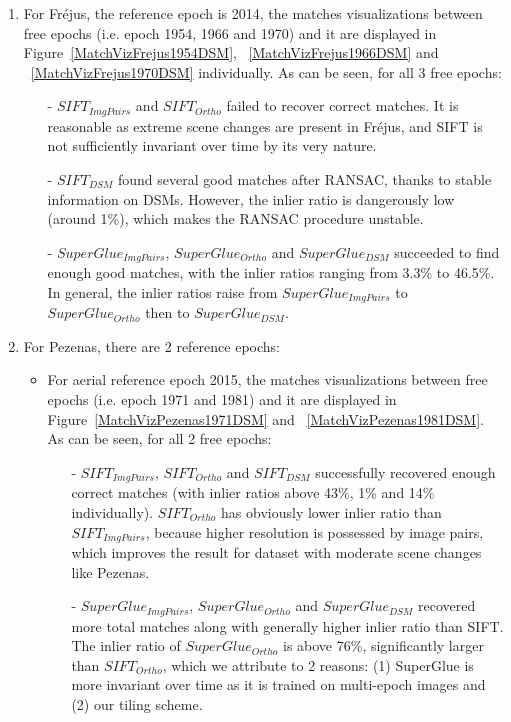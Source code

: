 \begin{enumerate}
	\item For Fr{\'e}jus, the reference epoch is 2014, the matches visualizations between free epochs (i.e. epoch 1954, 1966 and 1970) and it are displayed in Figure~\ref{MatchVizFrejus1954DSM}, ~\ref{MatchVizFrejus1966DSM} and ~\ref{MatchVizFrejus1970DSM} individually. As can be seen, for all 3 free epochs:\\
	\begin{itemize}
		\item[-] $SIFT_{ImgPairs}$ and $SIFT_{Ortho}$ failed to recover correct matches. It is reasonable as extreme scene changes are present in Fr{\'e}jus, and SIFT is not sufficiently invariant over time by its very nature.
		\item[-] $SIFT_{DSM}$ found several good matches after RANSAC, thanks to stable information on DSMs. However, the inlier ratio is dangerously low (around 1\%), which makes the RANSAC procedure unstable.
		\item[-] $SuperGlue_{ImgPairs}$, $SuperGlue_{Ortho}$ and $SuperGlue_{DSM}$ succeeded to find enough good matches, with the inlier ratios ranging from 3.3\% to 46.5\%. In general, the inlier ratios raise from $SuperGlue_{ImgPairs}$ to $SuperGlue_{Ortho}$ then to $SuperGlue_{DSM}$.
	\end{itemize}
	\item For Pezenas, there are 2 reference epochs:\\
	\begin{itemize}
	\item For aerial reference epoch 2015, the matches visualizations between free epochs (i.e. epoch 1971 and 1981) and it are displayed in Figure~\ref{MatchVizPezenas1971DSM} and ~\ref{MatchVizPezenas1981DSM}. As can be seen, for all 2 free epochs:\\
		\begin{itemize}
			\item[-] $SIFT_{ImgPairs}$, $SIFT_{Ortho}$ and $SIFT_{DSM}$ successfully recovered enough correct matches (with inlier ratios above 43\%, 1\% and 14\% individually). $SIFT_{Ortho}$ has obviously lower inlier ratio than $SIFT_{ImgPairs}$, because higher resolution is possessed by image pairs, which improves the result for dataset with moderate scene changes like Pezenas.
			\item[-] $SuperGlue_{ImgPairs}$, $SuperGlue_{Ortho}$ and $SuperGlue_{DSM}$ recovered more total matches along with generally higher inlier ratio than SIFT. The inlier ratio of $SuperGlue_{Ortho}$ is above 76\%, significantly larger than $SIFT_{Ortho}$, which we attribute to 2 reasons: (1) SuperGlue is more invariant over time as it is trained on multi-epoch images and (2) our tiling scheme. 

\end{itemize}
\end{itemize}
\end{enumerate}

